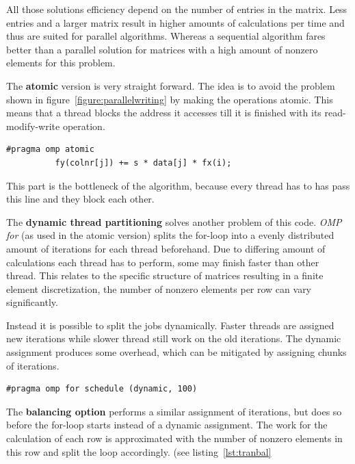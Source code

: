 \documentclass[a4paper,11pt]{scrartcl}
\begin{document}
All those solutions efficiency depend on the number of entries in the matrix.
Less entries and a larger matrix result in higher amounts of calculations per
time and thus are suited for parallel algorithms.
Whereas a sequential algorithm fares better than a parallel solution for
matrices with a high amount of nonzero elements for this problem.

The \textbf{atomic} version is very straight forward. The idea is to avoid the
problem shown in figure~\ref{figure:parallelwriting} by making the operations
atomic. This means that a thread blocks the address it accesses till it is
finished with its read-modify-write operation.

\begin{lstlisting}
#pragma omp atomic
          fy(colnr[j]) += s * data[j] * fx(i);
\end{lstlisting}

This part is the bottleneck of the algorithm, because every thread has to has
pass this line and they block each other.

The \textbf{dynamic thread partitioning} solves another problem of this code.
{\em OMP for}\/ (as used in the atomic version) splits the for-loop into a
evenly distributed amount of iterations for each thread beforehand. Due to
differing amount of calculations each thread has to perform, some may finish
faster than other thread. This relates to the specific structure of matrices
resulting in a finite element discretization, the number of nonzero elements
per row can vary significantly.

Instead it is possible to split the jobs dynamically. Faster threads are
assigned new iterations while slower thread still work on the old iterations.
The dynamic assignment produces some overhead, which can be mitigated by
assigning chunks of iterations.

\begin{lstlisting}
#pragma omp for schedule (dynamic, 100)
\end{lstlisting}

The \textbf{balancing option} performs a similar assignment of iterations, but
does so before the for-loop starts instead of a dynamic assignment. The work
for the calculation of each row is approximated with the number of nonzero
elements in this row and split the loop accordingly. (see listing~\ref{lst:tranbal}
\end{document}
